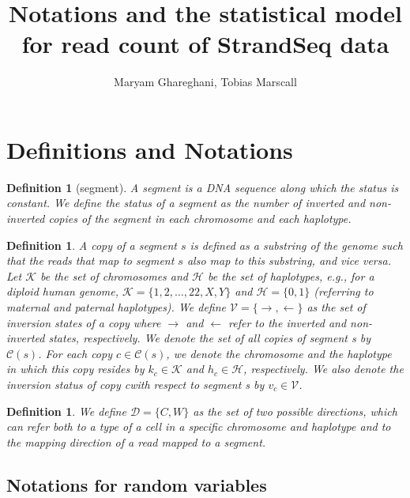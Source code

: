 \documentclass[12pt]{article}
\title{Notations and the statistical model for read count of StrandSeq data}
\author{Maryam Ghareghani, Tobias Marscall}
\renewcommand{\c}{c} %
\newcommand{\C}{\mathcal{C}} %
\renewcommand{\i}{v} %
\newcommand{\I}{\mathcal{V}} %
\newcommand{\D}{\mathcal{D}} %
\newcommand{\Crick}{C}
\newcommand{\Watson}{W}
\newcommand{\chr}{k}
\newcommand{\Chr}{\mathcal{K}}
\newcommand{\h}{h} %
\renewcommand{\H}{\mathcal{H}} %
\newtheorem{definition}[theorem]{Definition}
\begin{document}
\maketitle

\section{Definitions and Notations}

\begin{definition}[segment]
A segment is a DNA sequence along which the status is constant. We define the status of a segment as the number of inverted and non-inverted copies of the segment in each chromosome and each haplotype.
\end{definition}

\begin{definition}
A copy of a segment $s$ is defined as a substring of the genome such that the reads that map to segment $s$ also map to this substring, and vice versa. Let $\Chr$ be the set of chromosomes and $\H$ be the set of haplotypes, e.g., for a diploid human genome, $\Chr = \{1,2,\ldots, 22, X, Y\}$ and $\H = \{0,1\}$ (referring to maternal and paternal haplotypes). We define $\I = \{\rightarrow, \leftarrow\}$ as the set of inversion states of a copy where $\rightarrow$ and $\leftarrow$ refer to the inverted and non-inverted states, respectively. We denote the set of all copies of segment \textit{s} by $\C(s)$. For each copy $\c \in \C(s)$, we denote the chromosome and the haplotype in which this copy resides by $\chr_\c \in \Chr$ and $\h_\c \in \H$, respectively. We also denote the inversion status of copy \c with respect to segment \textit{s} by $\i_\c \in \I$.
\end{definition}

\begin{definition}
We define $\D = \{\Crick,\Watson\}$ as the set of two possible directions, which can refer both to a type of a cell in a specific chromosome and haplotype and to the mapping direction of a read mapped to a segment.
\end{definition}

\subsection{Notations for random variables}
\end{document}
